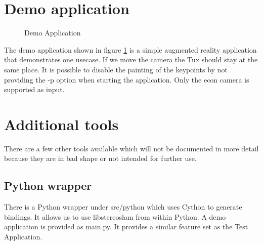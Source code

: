 \documentclass[11pt,a4paper,titlepage,oneside]{report}
\begin{document}
\section{Demo application}
\begin{figure}[H]
  \centering
  \qquad
  \caption{Demo Application}\label{fig:demo_application}
\end{figure}

The demo application shown in figure \ref{fig:demo_application} is a simple augmented reality application that demonstrates one usecase. If we move the camera the Tux should stay at the same place. It is possible to disable the painting of the keypoints by not providing the -p option when starting the application. Only the econ camera is supported as input.

\section{Additional tools}

There are a few other tools available which will not be documented in more detail because they are in bad shape or not intended for further use.

\subsection{Python wrapper}
There is a Python wrapper under src/python which uses Cython to generate bindings. It allows us to use libstereoslam from within Python. A demo application is provided as main.py. It provides a similar feature set as the Test Application.
\end{document}
